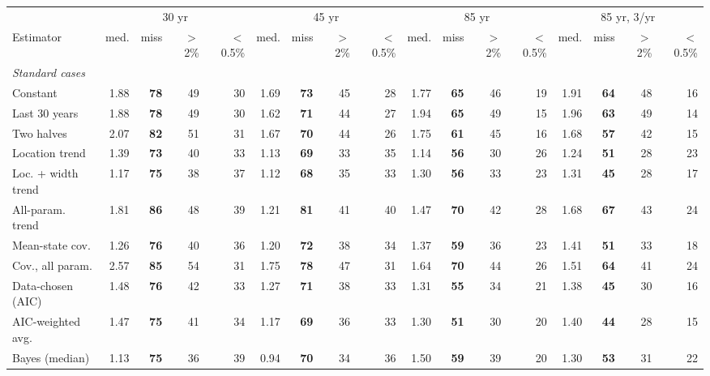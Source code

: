 \begin{tabular}{lrrrrrrrrrrrrrrrr}
\toprule
 & \multicolumn{4}{c}{30 yr} & \multicolumn{4}{c}{45 yr} & \multicolumn{4}{c}{85 yr} & \multicolumn{4}{c}{85 yr, 3/yr} \\
\cmidrule(lr){2-5} \cmidrule(lr){6-9} \cmidrule(lr){10-13} \cmidrule(lr){14-17}
Estimator & med. & miss & $>$2\% & $<$0.5\% & med. & miss & $>$2\% & $<$0.5\% & med. & miss & $>$2\% & $<$0.5\% & med. & miss & $>$2\% & $<$0.5\% \\
\midrule
\multicolumn{17}{l}{\emph{Standard cases}} \\
Constant & 1.88 & \textbf{78} & 49 & 30 & 1.69 & \textbf{73} & 45 & 28 & 1.77 & \textbf{65} & 46 & 19 & 1.91 & \textbf{64} & 48 & 16 \\
Last 30 years & 1.88 & \textbf{78} & 49 & 30 & 1.62 & \textbf{71} & 44 & 27 & 1.94 & \textbf{65} & 49 & 15 & 1.96 & \textbf{63} & 49 & 14 \\
Two halves & 2.07 & \textbf{82} & 51 & 31 & 1.67 & \textbf{70} & 44 & 26 & 1.75 & \textbf{61} & 45 & 16 & 1.68 & \textbf{57} & 42 & 15 \\
Location trend & 1.39 & \textbf{73} & 40 & 33 & 1.13 & \textbf{69} & 33 & 35 & 1.14 & \textbf{56} & 30 & 26 & 1.24 & \textbf{51} & 28 & 23 \\
Loc. + width trend & 1.17 & \textbf{75} & 38 & 37 & 1.12 & \textbf{68} & 35 & 33 & 1.30 & \textbf{56} & 33 & 23 & 1.31 & \textbf{45} & 28 & 17 \\
All-param. trend & 1.81 & \textbf{86} & 48 & 39 & 1.21 & \textbf{81} & 41 & 40 & 1.47 & \textbf{70} & 42 & 28 & 1.68 & \textbf{67} & 43 & 24 \\
Mean-state cov. & 1.26 & \textbf{76} & 40 & 36 & 1.20 & \textbf{72} & 38 & 34 & 1.37 & \textbf{59} & 36 & 23 & 1.41 & \textbf{51} & 33 & 18 \\
Cov., all param. & 2.57 & \textbf{85} & 54 & 31 & 1.75 & \textbf{78} & 47 & 31 & 1.64 & \textbf{70} & 44 & 26 & 1.51 & \textbf{64} & 41 & 24 \\
Data-chosen (AIC) & 1.48 & \textbf{76} & 42 & 33 & 1.27 & \textbf{71} & 38 & 33 & 1.31 & \textbf{55} & 34 & 21 & 1.38 & \textbf{45} & 30 & 16 \\
AIC-weighted avg. & 1.47 & \textbf{75} & 41 & 34 & 1.17 & \textbf{69} & 36 & 33 & 1.30 & \textbf{51} & 30 & 20 & 1.40 & \textbf{44} & 28 & 15 \\
Bayes (median) & 1.13 & \textbf{75} & 36 & 39 & 0.94 & \textbf{70} & 34 & 36 & 1.50 & \textbf{59} & 39 & 20 & 1.30 & \textbf{53} & 31 & 22 \\

\end{tabular}
